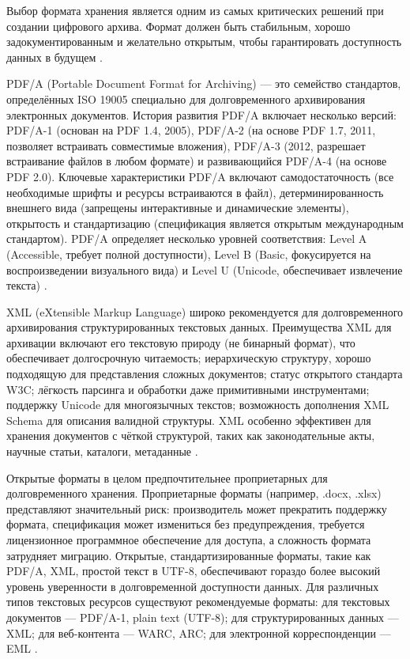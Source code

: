 \documentclass{SibFU-docs}
\begin{document}

Выбор формата хранения является одним из самых критических решений при создании цифрового архива. Формат должен быть стабильным, хорошо задокументированным и желательно открытым, чтобы гарантировать доступность данных в будущем \cite{PARADISEC2024StandardFormats, EmersonCollege2025PreservationFormats}.

PDF/A (Portable Document Format for Archiving) — это семейство стандартов, определённых ISO 19005 специально для долговременного архивирования электронных документов. История развития PDF/A включает несколько версий: PDF/A-1 (основан на PDF 1.4, 2005), PDF/A-2 (на основе PDF 1.7, 2011, позволяет встраивать совместимые вложения), PDF/A-3 (2012, разрешает встраивание файлов в любом формате) и развивающийся PDF/A-4 (на основе PDF 2.0). Ключевые характеристики PDF/A включают самодостаточность (все необходимые шрифты и ресурсы встраиваются в файл), детерминированность внешнего вида (запрещены интерактивные и динамические элементы), открытость и стандартизацию (спецификация является открытым международным стандартом). PDF/A определяет несколько уровней соответствия: Level A (Accessible, требует полной доступности), Level B (Basic, фокусируется на воспроизведении визуального вида) и Level U (Unicode, обеспечивает извлечение текста) \cite{LOC2024PDFA, PDFAssociation2025ISO19005, PDFAssociation2025ISO19005Part1}.

XML (eXtensible Markup Language) широко рекомендуется для долговременного архивирования структурированных текстовых данных. Преимущества XML для архивации включают его текстовую природу (не бинарный формат), что обеспечивает долгосрочную читаемость; иерархическую структуру, хорошо подходящую для представления сложных документов; статус открытого стандарта W3C; лёгкость парсинга и обработки даже примитивными инструментами; поддержку Unicode для многоязычных текстов; возможность дополнения XML Schema для описания валидной структуры. XML особенно эффективен для хранения документов с чёткой структурой, таких как законодательные акты, научные статьи, каталоги, метаданные \cite{Sphereon2020DigitalPreservationPDFA, DigitalPreservation2008OfficeOpenXMLStandards}.

Открытые форматы в целом предпочтительнее проприетарных для долговременного хранения. Проприетарные форматы (например, .docx, .xlsx) представляют значительный риск: производитель может прекратить поддержку формата, спецификация может измениться без предупреждения, требуется лицензионное программное обеспечение для доступа, а сложность формата затрудняет миграцию. Открытые, стандартизированные форматы, такие как PDF/A, XML, простой текст в UTF-8, обеспечивают гораздо более высокий уровень уверенности в долговременной доступности данных. Для различных типов текстовых ресурсов существуют рекомендуемые форматы: для текстовых документов — PDF/A-1, plain text (UTF-8); для структурированных данных — XML; для веб-контента — WARC, ARC; для электронной корреспонденции — EML \cite{Soutron2025TrustedDigitalRepository, Wikipedia2004ArchiveFormats}.
\end{document}
